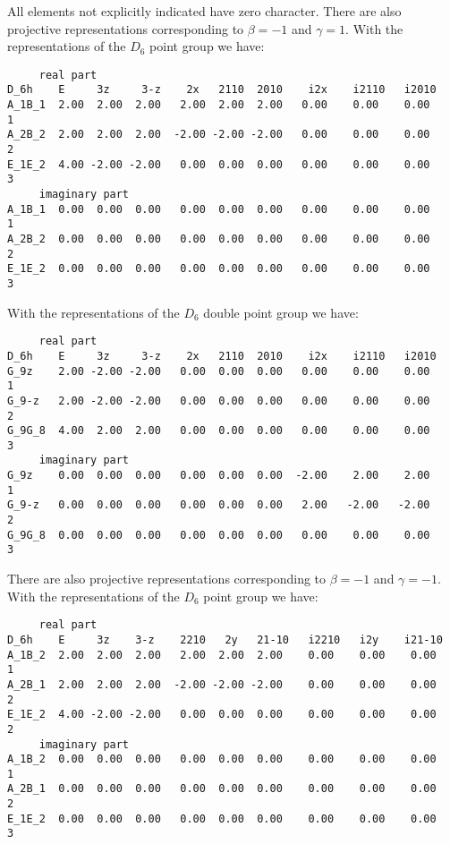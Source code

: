 \documentclass[12pt,a4paper,twoside]{report}
\begin{document}
All elements not explicitly indicated have zero character.
There are also projective representations corresponding to $\beta=-1$ 
and $\gamma=1$. With the representations of the $D_6$ point group we have:  

\begin{tcolorbox}
\begin{footnotesize}
\begin{verbatim}
     real part
D_6h    E     3z     3-z    2x   2110  2010    i2x    i2110   i2010
A_1B_1  2.00  2.00  2.00   2.00  2.00  2.00   0.00    0.00    0.00     1
A_2B_2  2.00  2.00  2.00  -2.00 -2.00 -2.00   0.00    0.00    0.00     2
E_1E_2  4.00 -2.00 -2.00   0.00  0.00  0.00   0.00    0.00    0.00     3
     imaginary part
A_1B_1  0.00  0.00  0.00   0.00  0.00  0.00   0.00    0.00    0.00     1
A_2B_2  0.00  0.00  0.00   0.00  0.00  0.00   0.00    0.00    0.00     2
E_1E_2  0.00  0.00  0.00   0.00  0.00  0.00   0.00    0.00    0.00     3
\end{verbatim}
\end{footnotesize}
\end{tcolorbox}

With the representations of the $D_6$ double point group we have:

\begin{tcolorbox}
\begin{footnotesize}
\begin{verbatim}
     real part
D_6h    E     3z     3-z    2x   2110  2010    i2x    i2110   i2010
G_9z    2.00 -2.00 -2.00   0.00  0.00  0.00   0.00    0.00    0.00     1
G_9-z   2.00 -2.00 -2.00   0.00  0.00  0.00   0.00    0.00    0.00     2
G_9G_8  4.00  2.00  2.00   0.00  0.00  0.00   0.00    0.00    0.00     3
     imaginary part
G_9z    0.00  0.00  0.00   0.00  0.00  0.00  -2.00    2.00    2.00     1
G_9-z   0.00  0.00  0.00   0.00  0.00  0.00   2.00   -2.00   -2.00     2
G_9G_8  0.00  0.00  0.00   0.00  0.00  0.00   0.00    0.00    0.00     3
\end{verbatim}
\end{footnotesize}
\end{tcolorbox}

There are also projective representations corresponding to $\beta=-1$ 
and $\gamma=-1$. With the representations of the $D_6$ point group we have:  

\begin{tcolorbox}
\begin{footnotesize}
\begin{verbatim}
     real part
D_6h    E     3z    3-z    2210   2y   21-10   i2210   i2y    i21-10
A_1B_2  2.00  2.00  2.00   2.00  2.00  2.00    0.00    0.00    0.00     1
A_2B_1  2.00  2.00  2.00  -2.00 -2.00 -2.00    0.00    0.00    0.00     2
E_1E_2  4.00 -2.00 -2.00   0.00  0.00  0.00    0.00    0.00    0.00     2
     imaginary part
A_1B_2  0.00  0.00  0.00   0.00  0.00  0.00    0.00    0.00    0.00     1
A_2B_1  0.00  0.00  0.00   0.00  0.00  0.00    0.00    0.00    0.00     2
E_1E_2  0.00  0.00  0.00   0.00  0.00  0.00    0.00    0.00    0.00     3
\end{verbatim}
\end{footnotesize}
\end{tcolorbox}
\end{document}
